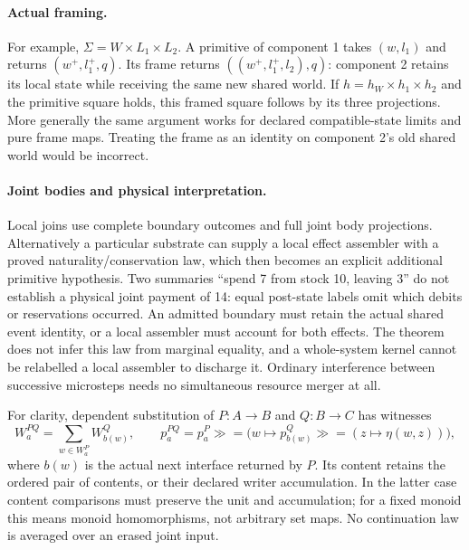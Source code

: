 \documentclass[11pt]{article}
\begin{document}
\paragraph{Actual framing.} For example, $\Sigma=W\times L_1\times L_2$. A primitive of component 1 takes $(w,l_1)$ and returns $(w^+,l_1^+,q)$. Its frame returns $((w^+,l_1^+,l_2),q)$: component 2 retains its local state while receiving the same new shared world. If $h=h_W\times h_1\times h_2$ and the primitive square holds, this framed square follows by its three projections. More generally the same argument works for declared compatible-state limits and pure frame maps. Treating the frame as an identity on component 2's old shared world would be incorrect.

\paragraph{Joint bodies and physical interpretation.} Local joins use complete boundary outcomes and full joint body projections. Alternatively a particular substrate can supply a local effect assembler with a proved naturality/conservation law, which then becomes an explicit additional primitive hypothesis. Two summaries ``spend 7 from stock 10, leaving 3'' do not establish a physical joint payment of 14: equal post-state labels omit which debits or reservations occurred. An admitted boundary must retain the actual shared event identity, or a local assembler must account for both effects. The theorem does not infer this law from marginal equality, and a whole-system kernel cannot be relabelled a local assembler to discharge it. Ordinary interference between successive microsteps needs no simultaneous resource merger at all.

For clarity, dependent substitution of $P:A\to B$ and $Q:B\to C$ has witnesses
\[
 W^{PQ}_a=\sum_{w\in W^P_a}W^Q_{b(w)},\qquad
 p^{PQ}_a=p^P_a\mathbin{\gg=}\bigl(w\mapsto p^Q_{b(w)}\mathbin{\gg=}(z\mapsto\eta(w,z))\bigr), \tag{B}\label{eq:bind}
\]
where $b(w)$ is the actual next interface returned by $P$. Its content retains the ordered pair of contents, or their declared writer accumulation. In the latter case content comparisons must preserve the unit and accumulation; for a fixed monoid this means monoid homomorphisms, not arbitrary set maps. No continuation law is averaged over an erased joint input.
\end{document}
